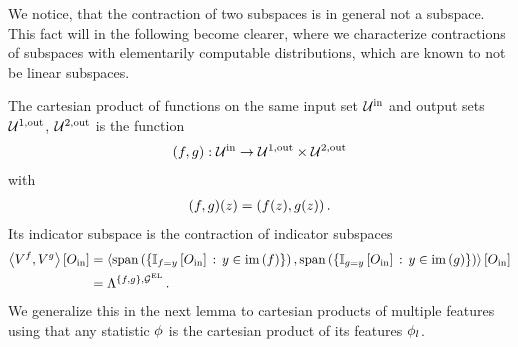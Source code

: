 We notice, that the contraction of two subspaces is in general not a subspace.
This fact will in the following become clearer, where we characterize contractions of subspaces with elementarily computable distributions, which are known to not be linear subspaces.

The cartesian product of functions on the same input set $\mathcal{U}^{\mathrm{in}}$ and output sets $\mathcal{U}^{1,\mathrm{out}}$, $\mathcal{U}^{2,\mathrm{out}}$ is the function
\begin{align*}
(f,g)
    : \mathcal{U}^{\mathrm{in}} \rightarrow \mathcal{U}^{1,\mathrm{out}} \times \mathcal{U}^{2,\mathrm{out}}
\end{align*}
with
\begin{align*}
(f,g)(z)
    = (f(z),g(z)) \, .
\end{align*}
Its indicator subspace is the contraction of indicator subspaces
\begin{align*}
    \left\langle V^{f},V^{g}\right\rangle \left[ O_{\mathrm{in}} \right]
    & = \left\langle 
        \mathrm{span}\left(\{\mathbb{I}_{f=y}\left[O_{\mathrm{in}}\right] \,:\, y\in\mathrm{im}\left(f\right)\}\right),
        \mathrm{span}\left(\{\mathbb{I}_{g=y}\left[O_{\mathrm{in}}\right] \,:\, y\in\mathrm{im}\left(g\right)\}\right)
    \right\rangle \left[ O_{\mathrm{in}} \right] \\
    & = \Lambda^{\{f, g\},\mathcal{G}^{\mathrm{EL}}} \, .
\end{align*}
We generalize this in the next lemma to cartesian products of multiple features using that any statistic $\phi$ is the cartesian product of its features $\phi_{l}$.

